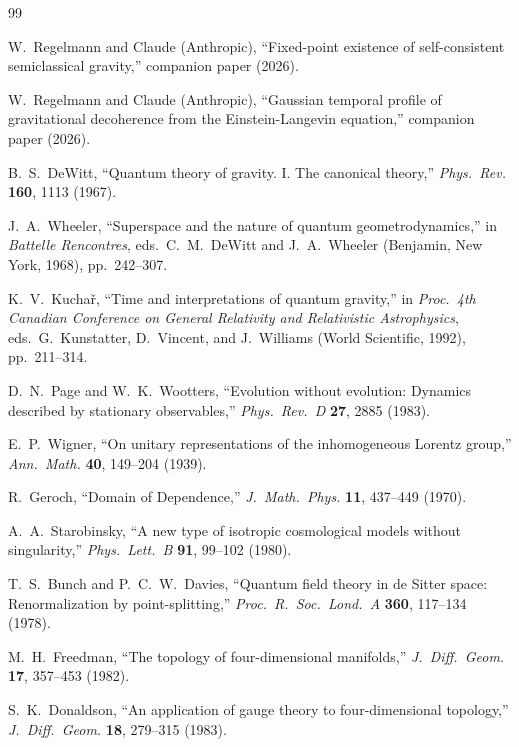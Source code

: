 \documentclass[12pt,a4paper]{article}
\theoremstyle{definition}
\theoremstyle{remark}
\begin{document}
\begin{thebibliography}{99}

W.~Regelmann and Claude (Anthropic),
``Fixed-point existence of self-consistent semiclassical gravity,''
companion paper (2026).

W.~Regelmann and Claude (Anthropic),
``Gaussian temporal profile of gravitational decoherence from the
Einstein-Langevin equation,''
companion paper (2026).

B.~S.~DeWitt,
``Quantum theory of gravity. I. The canonical theory,''
\textit{Phys.\ Rev.} \textbf{160}, 1113 (1967).

J.~A.~Wheeler,
``Superspace and the nature of quantum geometrodynamics,''
in \textit{Battelle Rencontres}, eds.\ C.~M.~DeWitt and J.~A.~Wheeler
(Benjamin, New York, 1968), pp.~242--307.

K.~V.~Kucha\v{r},
``Time and interpretations of quantum gravity,''
in \textit{Proc.\ 4th Canadian Conference on General Relativity and
Relativistic Astrophysics}, eds.\ G.~Kunstatter, D.~Vincent, and
J.~Williams (World Scientific, 1992), pp.~211--314.

D.~N.~Page and W.~K.~Wootters,
``Evolution without evolution: Dynamics described by stationary observables,''
\textit{Phys.\ Rev.\ D} \textbf{27}, 2885 (1983).

E.~P.~Wigner,
``On unitary representations of the inhomogeneous Lorentz group,''
\textit{Ann.\ Math.} \textbf{40}, 149--204 (1939).

R.~Geroch,
``Domain of Dependence,''
\textit{J.\ Math.\ Phys.} \textbf{11}, 437--449 (1970).

A.~A.~Starobinsky,
``A new type of isotropic cosmological models without singularity,''
\textit{Phys.\ Lett.\ B} \textbf{91}, 99--102 (1980).

T.~S.~Bunch and P.~C.~W.~Davies,
``Quantum field theory in de Sitter space: Renormalization by point-splitting,''
\textit{Proc.\ R.\ Soc.\ Lond.\ A} \textbf{360}, 117--134 (1978).

M.~H.~Freedman,
``The topology of four-dimensional manifolds,''
\textit{J.\ Diff.\ Geom.} \textbf{17}, 357--453 (1982).

S.~K.~Donaldson,
``An application of gauge theory to four-dimensional topology,''
\textit{J.\ Diff.\ Geom.} \textbf{18}, 279--315 (1983).


\end{thebibliography}
\end{document}
